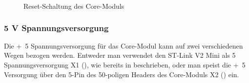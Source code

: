 \begin{figure}[H]
    \centering
    \qquad
    \qquad
    \caption[Reset-Schaltung des Core-Moduls]{Reset-Schaltung des \gls{Core-Modul}s}
    \label{fig:coremodul-reset}
\end{figure}

\newpage
\subsubsection{5 V Spannungsversorgung}
Die \unit{+5}{\volt} Spannungsversorgung für das \gls{Core-Modul} kann auf zwei verschiedenen Wegen bezogen werden. Entweder man verwendet den ST-Link V2 Mini als \unit{5}{\volt} Spannungsversorgung X1 (), wie bereits in  beschrieben, oder man speist die \unit{+5}{\volt} Versorgung über den \unit{5}{\volt}-Pin des 50-poligen Headers des \gls{Core-Modul}s X2 () ein.


